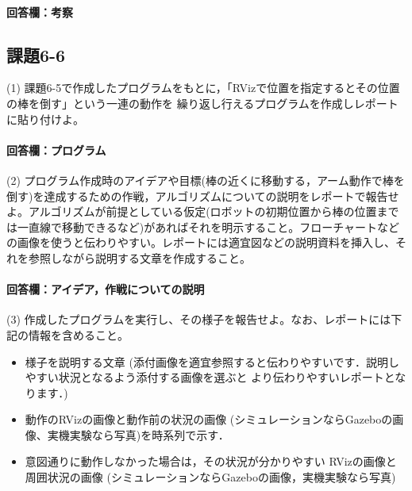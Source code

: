 \documentclass[12pt, xelatex,ja=standard,jafont=noto]{bxjsarticle}
\newif\ifdraft
\begin{document}
\paragraph{回答欄：考察}
\ifdraft
詳しい考察を記載する。
\fi

\subsection{課題6-6}
\begin{itembox}[l]{(1)}
課題6-5で作成したプログラムをもとに，「RVizで位置を指定するとその位置の棒を倒す」という一連の動作を 繰り返し行えるプログラムを作成しレポートに貼り付けよ。
\end{itembox}

\paragraph{回答欄：プログラム}
\ifdraft
RVizで棒の立っている位置を指定するとその棒の近くに移動し，アームを伸ばしてから回転させて棒を倒す動作を繰り返し行うプログラムをリスト\ref{lst:stickmoverepeat}に示す…
\begin{lstlisting}[caption=コード,label=lst:stickmoverepeat]
...
\end{lstlisting}
\fi

\begin{itembox}[l]{(2)}
プログラム作成時のアイデアや目標(棒の近くに移動する，アーム動作で棒を倒す)を達成するための作戦，アルゴリズムについての説明をレポートで報告せよ。アルゴリズムが前提としている仮定(ロボットの初期位置から棒の位置までは一直線で移動できるなど)があればそれを明示すること。フローチャートなどの画像を使うと伝わりやすい。レポートには適宜図などの説明資料を挿入し、それを参照しながら説明する文章を作成すること。
\end{itembox}

\paragraph{回答欄：アイデア，作戦についての説明}
\ifdraft
アイデアや作戦について図や画像を交えながら詳しく説明する．大きな加点対象
\fi

\begin{itembox}[l]{(3)}
作成したプログラムを実行し、その様子を報告せよ。なお、レポートには下記の情報を含めること。
\begin{itemize}
    \item 様子を説明する文章 (添付画像を適宜参照すると伝わりやすいです．説明しやすい状況となるよう添付する画像を選ぶと より伝わりやすいレポートとなります．)
    \item 動作のRVizの画像と動作前の状況の画像 (シミュレーションならGazeboの画像、実機実験なら写真)を時系列で示す．
    \item 意図通りに動作しなかった場合は，その状況が分かりやすい RVizの画像と周囲状況の画像 (シミュレーションならGazeboの画像，実機実験なら写真)
\end{itemize}
\end{itembox}
\end{document}
